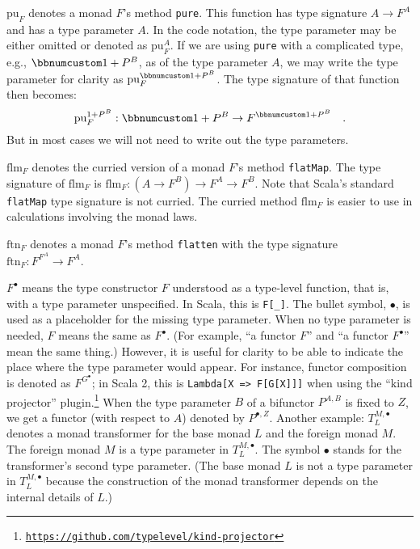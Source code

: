 $\text{pu}_{F}$ denotes a monad $F$\textsf{'}s method \lstinline!pure!.
This function has type signature $A\rightarrow F^{A}$ and has a type
parameter $A$. In the code notation, the type parameter may be either
omitted or denoted as $\text{pu}_{F}^{A}$. If we are using \lstinline!pure!
with a complicated type, e.g., $\bbnum 1+P^{B}$, as of the type parameter
$A$, we may write the type parameter for clarity as $\text{pu}_{F}^{\bbnum 1+P^{B}}$.
The type signature of that function then becomes: 
\[
\text{pu}_{F}^{1+P^{B}}:\bbnum 1+P^{B}\rightarrow F^{\bbnum 1+P^{B}}\quad.
\]
But in most cases we will not need to write out the type parameters.

$\text{flm}_{F}$ denotes the curried version of a monad $F$\textsf{'}s method
\lstinline!flatMap!. The type signature of $\text{flm}_{F}$ is $\text{flm}_{F}:(A\rightarrow F^{B})\rightarrow F^{A}\rightarrow F^{B}$.
Note that Scala\textsf{'}s standard \lstinline!flatMap! type signature is
not curried. The curried method $\text{flm}_{F}$ is easier to use
in calculations involving the monad laws.

$\text{ftn}_{F}$ denotes a monad $F$\textsf{'}s method \lstinline!flatten!
with the type signature $\text{ftn}_{F}:F^{F^{A}}\rightarrow F^{A}$.

$F^{\bullet}$ means the type constructor $F$ understood as a type-level
function, \textemdash{} that is, with a type parameter unspecified.
In Scala, this is \lstinline!F[_]!. The bullet symbol, $\bullet$,
is used as a placeholder for the missing type parameter. When no type
parameter is needed, $F$ means the same as $F^{\bullet}$. (For example,
\textsf{``}a functor $F$\textsf{''} and \textsf{``}a functor $F^{\bullet}$\textsf{''} mean the same
thing.) However, it is useful for clarity to be able to indicate the
place where the type parameter would appear. For instance, functor
composition is denoted as $F^{G^{\bullet}}$; in Scala 2, this is
\texttt{}\lstinline!Lambda[X => F[G[X]]]! when using the \textsf{``}kind
projector\textsf{''} plugin.\footnote{\texttt{\href{https://github.com/typelevel/kind-projector}{https://github.com/typelevel/kind-projector}}}
When the type parameter $B$ of a bifunctor $P^{A,B}$ is fixed to
$Z$, we get a functor (with respect to $A$) denoted by $P^{\bullet,Z}$.
Another example: $T_{L}^{M,\bullet}$ denotes a monad transformer
for the base monad $L$ and the foreign monad $M$. The foreign monad
$M$ is a type parameter in $T_{L}^{M,\bullet}$. The symbol $\bullet$
stands for the transformer\textsf{'}s second type parameter. (The base monad
$L$ is not a type parameter in $T_{L}^{M,\bullet}$ because the construction
of the monad transformer depends on the internal details of $L$.)

